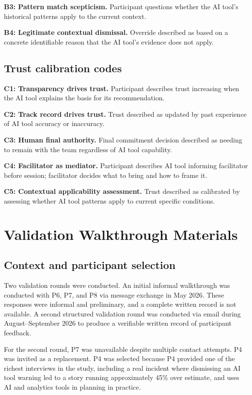 \documentclass[a4paper,twoside]{bth}
\begin{document}
\textbf{B3: Pattern match scepticism.} Participant questions whether the AI tool's historical patterns apply to the current context.

\textbf{B4: Legitimate contextual dismissal.} Override described as based on a concrete identifiable reason that the AI tool's evidence does not apply.

\section*{Trust calibration codes}

\textbf{C1: Transparency drives trust.} Participant describes trust increasing when the AI tool explains the basis for its recommendation.

\textbf{C2: Track record drives trust.} Trust described as updated by past experience of AI tool accuracy or inaccuracy.

\textbf{C3: Human final authority.} Final commitment decision described as needing to remain with the team regardless of AI tool capability.

\textbf{C4: Facilitator as mediator.} Participant describes AI tool informing facilitator before session; facilitator decides what to bring and how to frame it.

\textbf{C5: Contextual applicability assessment.} Trust described as calibrated by assessing whether AI tool patterns apply to current specific conditions.


\chapter{Validation Walkthrough Materials}
\label{app:validation}

\section*{Context and participant selection}

Two validation rounds were conducted. An initial informal walkthrough was conducted with P6, P7, and P8 via message exchange in May 2026. These responses were informal and preliminary, and a complete written record is not available. A second structured validation round was conducted via email during August--September 2026 to produce a verifiable written record of participant feedback.

For the second round, P7 was unavailable despite multiple contact attempts. P4 was invited as a replacement. P4 was selected because P4 provided one of the richest interviews in the study, including a real incident where dismissing an AI tool warning led to a story running approximately 45\% over estimate, and uses AI and analytics tools in planning in practice.
\end{document}
